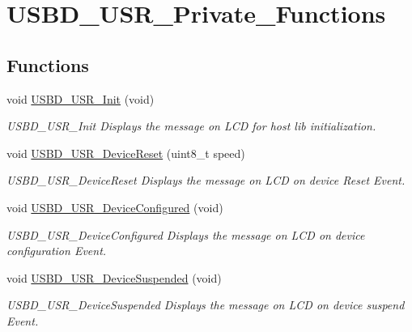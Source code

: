 \hypertarget{group__USBD__USR__Private__Functions}{\section{U\-S\-B\-D\-\_\-\-U\-S\-R\-\_\-\-Private\-\_\-\-Functions}
\label{group__USBD__USR__Private__Functions}
}
\subsection*{Functions}
\begin{DoxyCompactItemize}
\item 
void \hyperlink{group__USBD__USR__Private__Functions_ga439704d4d2254602e672f6ce0528e3eb}{U\-S\-B\-D\-\_\-\-U\-S\-R\-\_\-\-Init} (void)
\begin{DoxyCompactList}\small\item\em U\-S\-B\-D\-\_\-\-U\-S\-R\-\_\-\-Init Displays the message on L\-C\-D for host lib initialization. \end{DoxyCompactList}\item 
void \hyperlink{group__USBD__USR__Private__Functions_gac10ea223f86ed47e7619b25ab71ed83a}{U\-S\-B\-D\-\_\-\-U\-S\-R\-\_\-\-Device\-Reset} (uint8\-\_\-t speed)
\begin{DoxyCompactList}\small\item\em U\-S\-B\-D\-\_\-\-U\-S\-R\-\_\-\-Device\-Reset Displays the message on L\-C\-D on device Reset Event. \end{DoxyCompactList}\item 
void \hyperlink{group__USBD__USR__Private__Functions_ga8fad6d5efb792b500cfd1f5d0c970351}{U\-S\-B\-D\-\_\-\-U\-S\-R\-\_\-\-Device\-Configured} (void)
\begin{DoxyCompactList}\small\item\em U\-S\-B\-D\-\_\-\-U\-S\-R\-\_\-\-Device\-Configured Displays the message on L\-C\-D on device configuration Event. \end{DoxyCompactList}\item 
void \hyperlink{group__USBD__USR__Private__Functions_ga62204dce5d51990ef90d52f0c8efc9a7}{U\-S\-B\-D\-\_\-\-U\-S\-R\-\_\-\-Device\-Suspended} (void)
\begin{DoxyCompactList}\small\item\em U\-S\-B\-D\-\_\-\-U\-S\-R\-\_\-\-Device\-Suspended Displays the message on L\-C\-D on device suspend Event. \end{DoxyCompactList}\item 

\end{DoxyCompactItemize}
